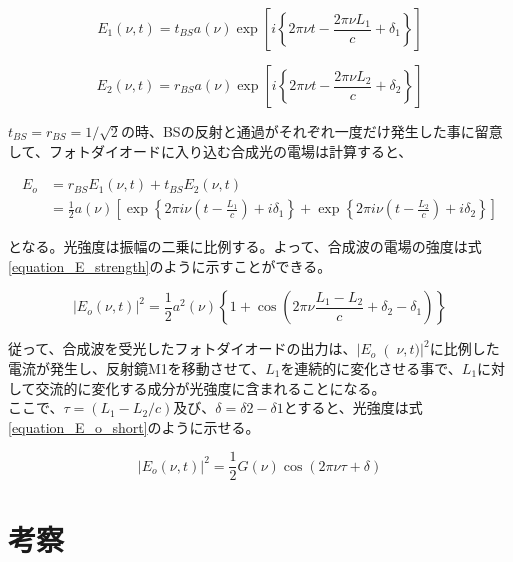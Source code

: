 \documentclass[uplatex, titlepage, fontsize=10pt, paper=a4paper]{jsarticle}
\numberwithin{equation}{section}
\begin{document}
\begin{equation}
    E_{1}(\nu, t) = t_{BS}a(\nu)\exp\left[i\left\{{2{\pi\nu}t-{\frac{2{\pi\nu}L_1}{c}}+\delta_1}\right\}\right] 
    \label{equation_E_M1}
\end{equation}

\begin{equation}
    E_{2}(\nu, t) = r_{BS}a(\nu)\exp\left[i\left\{{2{\pi\nu}t-{\frac{2{\pi\nu}L_2}{c}}+\delta_2}\right\}\right] 
    \label{equation_E_M2}
\end{equation}

$t_{BS}=r_{BS}=1/\sqrt{2}$の時、BSの反射と通過がそれぞれ一度だけ発生した事に留意して、フォトダイオードに入り込む合成光の電場は計算すると、

\begin{equation}
    \begin{split}
    E_{o}&=r_{BS}E_{1}(\nu,t)+t_{BS}E_{2}(\nu,t)\\
    &=\frac{1}{2}a(\nu)\left[\exp \left\{2\pi{i\nu}\left(t-\frac{L_1}{c}\right)+i\delta_1 \right\}+\exp \left\{2\pi{i\nu}\left(t-\frac{L_2}{c}\right)+i\delta_2 \right\} \right] 
    \label{equation_E_o}
    \end{split}
\end{equation}

となる。光強度は振幅の二乗に比例する。よって、合成波の電場の強度は式\ref{equation_E_strength}のように示すことができる。

\begin{equation}
    {\left\lvert E_{o}(\nu, t)\right\rvert} ^2 = \frac{1}{2}a^{2}(\nu)\left\{1+\cos\left(2\pi\nu\frac{L_{1}-L_{2}}{c}+\delta_{2}-\delta_{1}\right) \right\} 
    \label{equation_E_strength}
\end{equation}

従って、合成波を受光したフォトダイオードの出力は、${\left\lvert E_{o}\right(\nu,t)\rvert}^2$に比例した電流が発生し、反射鏡M1を移動させて、$L_{1}$を連続的に変化させる事で、$L_{1}$に対して交流的に変化する成分が光強度に含まれることになる。\\
ここで、$\tau=(L_{1}-L_{2}/c)$及び、$\delta=\delta{2}-\delta{1}$とすると、光強度は式\ref{equation_E_o_short}のように示せる。

\begin{equation}
    {\left\lvert E_{o}(\nu,t)\right\rvert}^2=\frac{1}{2}G(\nu)\cos(2\pi\nu\tau+\delta)
    \label{equation_E_o_short}
\end{equation}


\section{考察}
\end{document}
